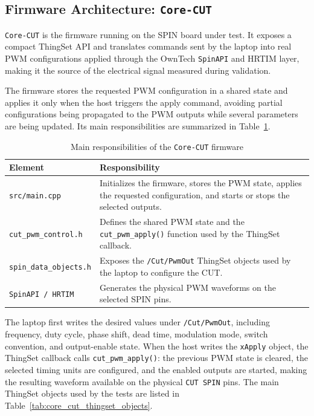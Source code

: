 \subsection{Firmware Architecture: \texttt{Core-CUT}}
\label{firmware-architecture-core-cut}

\texttt{Core-CUT} is the firmware running on the SPIN board under test.
It exposes a compact ThingSet API and translates commands sent by the
laptop into real PWM configurations applied through the OwnTech
\texttt{SpinAPI} and HRTIM layer, making it the source of the electrical
signal measured during validation.

The firmware stores the requested PWM configuration in a shared state
and applies it only when the host triggers the apply command, avoiding
partial configurations being propagated to the PWM outputs while
several parameters are being updated. Its main responsibilities are
summarized in Table~\ref{tab:core_cut_responsibilities}.

\begin{table}[H]
\centering
\caption{Main responsibilities of the \texttt{Core-CUT} firmware}
\label{tab:core_cut_responsibilities}
\small
\begin{tabularx}{\textwidth}{|p{4.5cm}|X|}
\hline
\textbf{Element} & \textbf{Responsibility} \\ \hline
\texttt{src/main.cpp} & Initializes the firmware, stores the PWM state, applies the requested configuration, and starts or stops the selected outputs. \\ \hline
\texttt{cut\_pwm\_control.h} & Defines the shared PWM state and the \texttt{cut\_pwm\_apply()} function used by the ThingSet callback. \\ \hline
\texttt{spin\_data\_objects.h} & Exposes the \texttt{/Cut/PwmOut} ThingSet objects used by the laptop to configure the CUT. \\ \hline
\texttt{SpinAPI / HRTIM} & Generates the physical PWM waveforms on the selected SPIN pins. \\ \hline
\end{tabularx}
\normalsize
\end{table}

The laptop first writes the desired values under \texttt{/Cut/PwmOut},
including frequency, duty cycle, phase shift, dead time, modulation
mode, switch convention, and output-enable state. When the host writes
the \texttt{xApply} object, the ThingSet callback calls
\texttt{cut\_pwm\_apply()}: the previous PWM state is cleared, the
selected timing units are configured, and the enabled outputs are
started, making the resulting waveform available on the physical
\texttt{CUT SPIN} pins. The main ThingSet objects used by the tests are
listed in Table~\ref{tab:core_cut_thingset_objects}.

